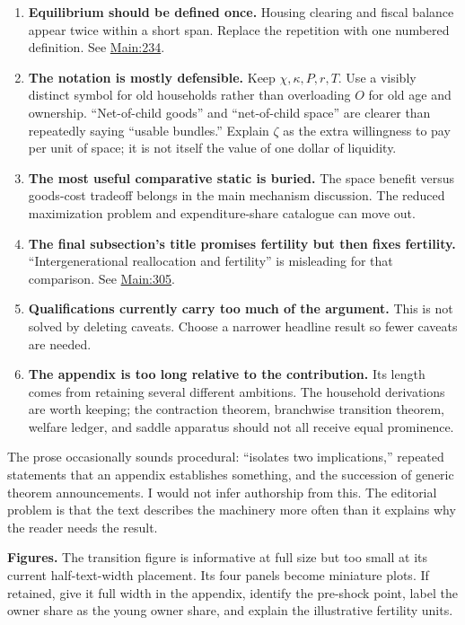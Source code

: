 \documentclass[11pt,letterpaper]{article}
\begin{document}
\begin{enumerate}
\item
  \textbf{Equilibrium should be defined once.} Housing clearing and fiscal balance appear
  twice within a short span. Replace the repetition with one numbered definition. See
  \hyperlink{source-main}{Main:234}.
\item
  \textbf{The notation is mostly defensible.} Keep \(\chi,\kappa,P,r,T\). Use a visibly
  distinct symbol for old households rather than overloading \(O\) for old age and
  ownership. ``Net-of-child goods'' and ``net-of-child space'' are clearer than repeatedly
  saying ``usable bundles.'' Explain \(\zeta\) as the extra willingness to pay per unit of
  space; it is not itself the value of one dollar of liquidity.
\item
  \textbf{The most useful comparative static is buried.} The space benefit versus
  goods-cost tradeoff belongs in the main mechanism discussion. The reduced maximization
  problem and expenditure-share catalogue can move out.
\item
  \textbf{The final subsection's title promises fertility but then fixes fertility.}
  ``Intergenerational reallocation and fertility'' is misleading for that comparison. See
  \hyperlink{source-main}{Main:305}.
\item
  \textbf{Qualifications currently carry too much of the argument.} This is not solved by
  deleting caveats. Choose a narrower headline result so fewer caveats are needed.
\item
  \textbf{The appendix is too long relative to the contribution.} Its length comes from
  retaining several different ambitions. The household derivations are worth keeping; the
  contraction theorem, branchwise transition theorem, welfare ledger, and saddle apparatus
  should not all receive equal prominence.
\end{enumerate}

The prose occasionally sounds procedural: ``isolates two implications,'' repeated
statements that an appendix establishes something, and the succession of generic theorem
announcements. I would not infer authorship from this. The editorial problem is that the
text describes the machinery more often than it explains why the reader needs the result.

\textbf{Figures.} The transition figure is informative at full size but too small at its
current half-text-width placement. Its four panels become miniature plots. If retained,
give it full width in the appendix, identify the pre-shock point, label the owner share as
the young owner share, and explain the illustrative fertility units.
\end{document}
